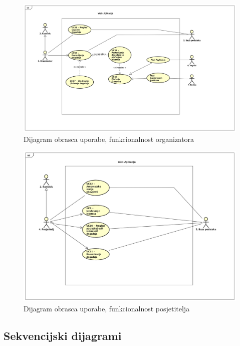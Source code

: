 					\begin{figure}[H]
						\includegraphics[scale=0.37]{dijagrami/Organizator_UC_dijagram.png} %
						\centering
						\caption{Dijagram obrasca uporabe, funkcionalnost organizatora}
						\label{fig:promjene}
					\end{figure}
					
					\begin{figure}[H]
						\includegraphics[scale=0.42]{dijagrami/Posjetitelj_UC_dijagram.png} %
						\centering
						\caption{Dijagram obrasca uporabe, funkcionalnost posjetitelja}
						\label{fig:promjene}
					\end{figure}
					
				
				\eject		
				
			\subsection{Sekvencijski dijagrami}
				
